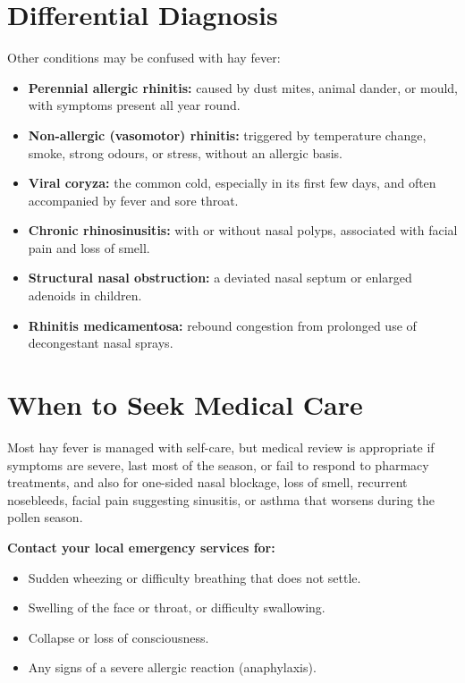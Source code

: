 \section*{Differential Diagnosis}
Other conditions may be confused with hay fever:

\begin{itemize}
    \item \textbf{Perennial allergic rhinitis:} caused by dust mites, animal dander, or mould, with symptoms present all year round.
    \item \textbf{Non-allergic (vasomotor) rhinitis:} triggered by temperature change, smoke, strong odours, or stress, without an allergic basis.
    \item \textbf{Viral coryza:} the common cold, especially in its first few days, and often accompanied by fever and sore throat.
    \item \textbf{Chronic rhinosinusitis:} with or without nasal polyps, associated with facial pain and loss of smell.
    \item \textbf{Structural nasal obstruction:} a deviated nasal septum or enlarged adenoids in children.
    \item \textbf{Rhinitis medicamentosa:} rebound congestion from prolonged use of decongestant nasal sprays.
\end{itemize}

\section*{When to Seek Medical Care}
Most hay fever is managed with self-care, but medical review is appropriate if symptoms are severe, last most of the season, or fail to respond to pharmacy treatments, and also for one-sided nasal blockage, loss of smell, recurrent nosebleeds, facial pain suggesting sinusitis, or asthma that worsens during the pollen season.

\textbf{Contact your local emergency services for:}
\begin{itemize}
    \item Sudden wheezing or difficulty breathing that does not settle.
    \item Swelling of the face or throat, or difficulty swallowing.
    \item Collapse or loss of consciousness.
    \item Any signs of a severe allergic reaction (anaphylaxis).
\end{itemize}


